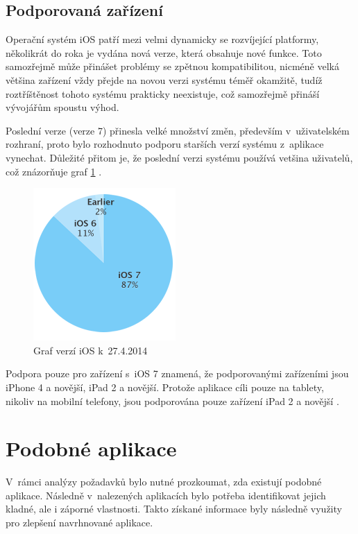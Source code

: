 \documentclass[thesis=B,czech]{FITthesis}[2012/06/26]
\begin{document}
\subsection{Podporovaná zařízení}

	Operační systém iOS patří mezi velmi dynamicky se rozvíjející platformy, několikrát do roka je vydána nová verze, která obsahuje nové funkce. Toto samozřejmě může přinášet problémy se zpětnou kompatibilitou, nicméně velká většina zařízení vždy přejde na novou verzi systému téměř okamžitě, tudíž roztříštěnost tohoto systému prakticky neexistuje, což samozřejmě přináší vývojářům spoustu výhod.

	Poslední verze (verze 7) přinesla velké množství změn, především v~uživatelském rozhraní, proto bylo rozhodnuto podporu starších verzí systému z~aplikace vynechat. Důležité přitom je, že poslední verzi systému používá vetšina uživatelů, což znázorňuje graf \ref{graph:ios7_stats} \cite{devAppleStats}.

	\begin{figure}[h!t]
		\centering
		\includegraphics{img/ios7stats}
		\caption{Graf verzí iOS k~27.4.2014 \cite{devAppleStats}}\label{graph:ios7_stats}
	\end{figure}

	Podpora pouze pro zařízení s~iOS 7 znamená, že podporovanými zařízeními jsou iPhone 4 a novější, iPad 2 a novější. Protože aplikace cíli pouze na tablety, nikoliv na mobilní telefony, jsou podporována pouze zařízení iPad 2 a novější \cite{ios7compat}.

\section{Podobné aplikace}\label{sec:competition}

	V~rámci analýzy požadavků bylo nutné prozkoumat, zda existují podobné aplikace. Následně v~nalezených aplikacích bylo potřeba identifikovat jejich kladné, ale i záporné vlastnosti. Takto získané informace byly následně využity pro zlepšení navrhnované aplikace.
\end{document}
